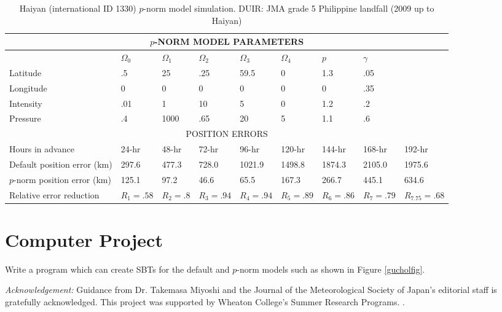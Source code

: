 \documentclass{SBCbookchapter}
\begin{document}
    \begin{table}[h]
\centering
\tiny
\begin{tabular}{|l|l|l|l|l|l|l|l|l|}
\multicolumn{9}{c}{$p$-NORM MODEL PARAMETERS }\\\hline
&$\Omega_0$ & $\Omega_1$ & $\Omega_2$ & $\Omega_3$ & $\Omega_4$ & $p$ &\multicolumn{2}{l|}{$\gamma$}\\\hline
Latitude &  .5 & 25 & .25 & 59.5 & 0 & 1.3 & \multicolumn{2}{l|}{.05} \\
Longitude &  0 & 0 & 0 & 0 & 0 & 0 & \multicolumn{2}{l|}{.35} \\
Intensity &  .01 & 1 & 10 & 5 & 0 & 1.2 & \multicolumn{2}{l|}{.2} \\
Pressure & .4 &1000&.65&20&5&1.1&\multicolumn{2}{l|}{.6} \\ \hline \hline
\multicolumn{9}{|c|}{POSITION ERRORS }\\\hline
  Hours in advance    & 24-hr & 48-hr &72-hr &96-hr & 120-hr & 144-hr & 168-hr& 192-hr\\\hline
  Default position error  (km)  &297.6  &477.3 & 728.0&1021.9 & 1498.8 &1874.3  & 2105.0 &  1975.6 \\\hline
  $p$-norm position error  (km)   &  125.1  &  97.2  & 46.6  & 65.5  & 167.3& 266.7  &  445.1&   634.6   \\\hline
  Relative error reduction & $R_1=.58 $  &$R_2=.8 $ &$R_3=.94 $ &$R_4=.94 $ &$R_5=.89 $ &$R_6=.86 $  &$R_7=.79 $ &  $R_{7.75} =.68 $   \\ \hline
 \end{tabular}
  \caption{Haiyan (international ID 1330) $p$-norm model simulation. DUIR: JMA grade 5 Philippine landfall (2009 up to Haiyan) }
  \label{typ2}
\end{table}



\section{Computer Project}
Write a program which can create SBTs for the default and $p$-norm models such as shown in Figure \ref{gucholfig}.





\vspace{1in}

\emph{Acknowledgement:} Guidance from Dr. Takemasa Miyoshi and the Journal of the Meteorological Society of Japan's editorial staff is gratefully acknowledged. This project was supported by Wheaton College's Summer Research Programs.
.
\vspace{.25in}
\end{document}
